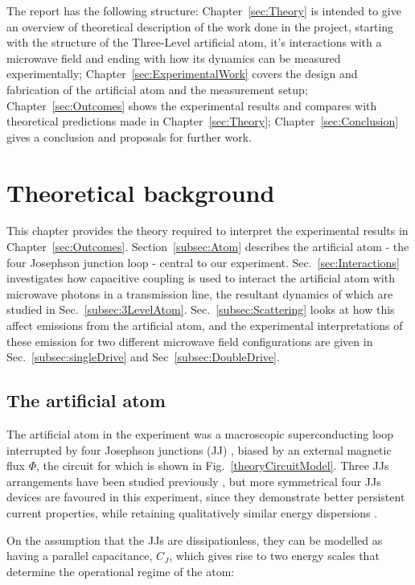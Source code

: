  The report has the following structure: Chapter~\ref{sec:Theory} is intended to give an overview of theoretical description of the work done in the project, starting with the structure of the Three-Level artificial atom, it's interactions with a microwave field and ending with how its dynamics can be measured experimentally; Chapter~\ref{sec:ExperimentalWork} covers the design and fabrication of the artificial atom and the measurement setup; Chapter~\ref{sec:Outcomes} shows the experimental results and compares with theoretical predictions made in Chapter~\ref{sec:Theory}; Chapter~\ref{sec:Conclusion} gives a conclusion and proposals for further work.
 \newpage
\section{Theoretical background\label{sec:Theory}}
 This chapter provides the theory required to interpret the experimental results in Chapter~\ref{sec:Outcomes}. Section~\ref{subsec:Atom} describes the artificial atom - the four Josephson junction loop - central to our experiment. Sec.~\ref{sec:Interactions} investigates how capacitive coupling is used to interact the artificial atom with microwave photons in a transmission line, the resultant dynamics of which are studied in Sec.~\ref{subsec:3LevelAtom}. Sec.~\ref{subsec:Scattering} looks at how this affect emissions from the artificial atom, and the experimental interpretations of these emission for two different microwave field configurations are given in Sec.~\ref{subsec:singleDrive} and Sec~\ref{subsec:DoubleDrive}.
 
 \subsection{The artificial atom\label{subsec:Atom}}
  The artificial atom in the experiment was a macroscopic superconducting loop interrupted by four Josephson junctions (JJ) \cite{coupledSuperconductors}, biased by an external magnetic flux $ \Phi $, the circuit for which is shown in Fig.~\ref{theoryCircuitModel}. Three JJs arrangements have been studied previously \cite{mooij_PersistentCurrentQubit,thesisExperimentsonSuperconductingQubits}, but more symmetrical four JJs devices are favoured in this experiment, since they demonstrate better persistent current properties, while retaining qualitatively similar energy dispersions \cite{DephasingofaSuperconducting}.
  
  On the assumption that the JJs are dissipationless, they can be modelled as having a parallel capacitance, $ C_{J} $, which gives rise to two energy scales that determine the operational regime of the atom: 
  
